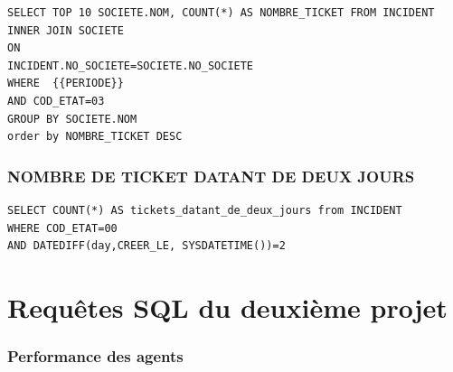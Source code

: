 \documentclass[a4paper,12pt]{report}
\begin{document}
\lstset{
language=SQL,
basicstyle=\footnotesize,
}
\begin{lstlisting}
SELECT TOP 10 SOCIETE.NOM, COUNT(*) AS NOMBRE_TICKET FROM INCIDENT
INNER JOIN SOCIETE
ON 
INCIDENT.NO_SOCIETE=SOCIETE.NO_SOCIETE
WHERE  {{PERIODE}} 
AND COD_ETAT=03
GROUP BY SOCIETE.NOM 
order by NOMBRE_TICKET DESC
\end{lstlisting}

\subsection{NOMBRE DE TICKET DATANT DE DEUX JOURS} 

\lstset{
language=SQL,
basicstyle=\footnotesize,
}
\begin{lstlisting}
SELECT COUNT(*) AS tickets_datant_de_deux_jours from INCIDENT  
WHERE COD_ETAT=00
AND DATEDIFF(day,CREER_LE, SYSDATETIME())=2
\end{lstlisting}
\chapter{Requêtes SQL du deuxième projet}

\subsection{Performance des agents} 
\end{document}
